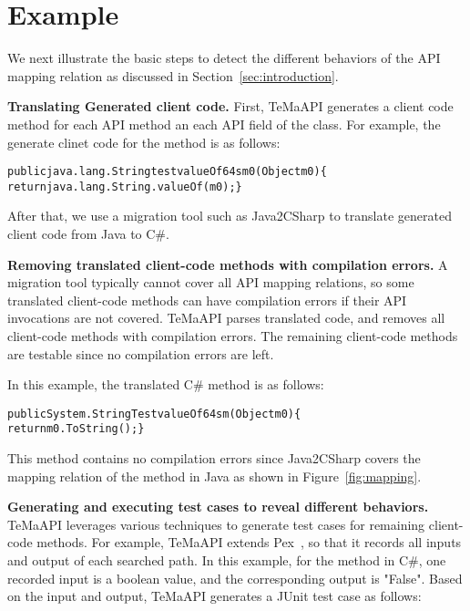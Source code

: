 \section{Example}
\label{sec:example}

We next illustrate the basic steps to detect the different behaviors of the API mapping relation as discussed in Section~\ref{sec:introduction}.

\textbf{Translating Generated client code.} First, TeMaAPI generates a client code method for each API method an each API field of the  class. For example, the generate clinet code for the  method is as follows:

\begin{CodeOut}%
\begin{alltt}
  public java.lang.String testvalueOf64sm0(Object m0)\{
    return java.lang.String.valueOf(m0);\}
\end{alltt}
\end{CodeOut}


After that, we use a migration tool such as Java2CSharp to translate generated client code from Java to C\#.

\textbf{Removing translated client-code methods with compilation errors.} A migration tool typically cannot cover all API mapping relations, so some translated client-code methods can have compilation errors if their API invocations are not covered. TeMaAPI parses translated code, and removes all client-code methods with compilation errors. The remaining client-code methods are testable since no compilation errors are left.

In this example, the translated C\#  method is as follows:
\begin{CodeOut}%
\begin{alltt}
  public System.String TestvalueOf64sm(Object m0) \{
    return m0.ToString();\}
\end{alltt}
\end{CodeOut}

This method contains no compilation errors since Java2CSharp covers the mapping relation of the method in Java as shown in Figure~\ref{fig:mapping}.

\textbf{Generating and executing test cases to reveal different behaviors.} TeMaAPI leverages various techniques to generate test cases for remaining client-code methods. For example, TeMaAPI extends Pex~\cite{tillmann2008pex}, so that it records all inputs and output of each searched path. In this example, for the  method in C\#, one recorded input is a boolean value, and the corresponding output is "False". Based on the input and output, TeMaAPI generates a JUnit test case as follows:

